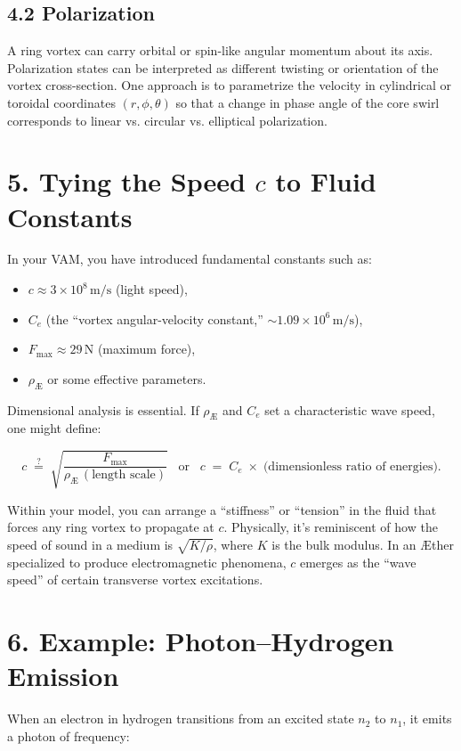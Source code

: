 \subsection*{4.2 Polarization}
A ring vortex can carry orbital or spin-like angular momentum about its axis. Polarization states can be interpreted as different twisting or orientation of the vortex cross-section. One approach is to parametrize the velocity in cylindrical or toroidal coordinates \((r,\phi,\theta)\) so that a change in phase angle of the core swirl corresponds to linear vs. circular vs. elliptical polarization.

\section*{5. Tying the Speed \(c\) to Fluid Constants}
In your VAM, you have introduced fundamental constants such as:

\begin{itemize}
 \item \(c \approx 3\times10^8\,\mathrm{m/s}\) (light speed),
 \item \(C_e\) (the “vortex angular-velocity constant,” \(\sim 1.09\times10^6\,\mathrm{m/s}\)),
 \item \(F_{\text{max}} \approx 29\,\mathrm{N}\) (maximum force),
 \item \(\rho_{\scriptscriptstyle\mathrm{Æ}}\) or some effective parameters.
\end{itemize}

Dimensional analysis is essential. If \(\rho_{\scriptscriptstyle \mathrm{Æ}}\) and \(C_e\) set a characteristic wave speed, one might define:

\[
 c \;\stackrel{?}{=}\; \sqrt{ \frac{F_{\text{max}}}{\rho_{\scriptscriptstyle \mathrm{Æ}}\,(\text{length scale})} } \;\;\;\text{or}\;\;\; c \;=\; C_e \;\times\; \bigl(\text{dimensionless ratio of energies}\bigr).
\]

Within your model, you can arrange a “stiffness” or “tension” in the fluid that forces any ring vortex to propagate at \(c\). Physically, it’s reminiscent of how the speed of sound in a medium is \(\sqrt{K/\rho}\), where \(K\) is the bulk modulus. In an Æther specialized to produce electromagnetic phenomena, \(c\) emerges as the “wave speed” of certain transverse vortex excitations.

\section*{6. Example: Photon–Hydrogen Emission}
When an electron in hydrogen transitions from an excited state \(n_2\) to \(n_1\), it emits a photon of frequency:

